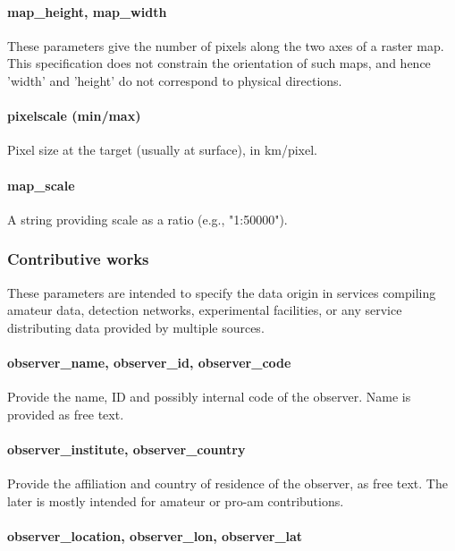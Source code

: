 \documentclass[11pt,a4paper]{ivoa}
\begin{document}
\paragraph{map\_height, map\_width}

These parameters give the number of pixels along the two axes of a raster map.
This specification does not constrain the orientation of such maps,
and hence 'width' and 'height' do not correspond to physical directions.

\paragraph{pixelscale (min/max)}

Pixel size at the target (usually at surface), in km/pixel.

\paragraph{map\_scale}
A string providing scale as a ratio (e.g., "1:50000").

\subsubsection{Contributive works}

These parameters are intended to specify the data origin in services
compiling amateur data, detection networks, experimental facilities,
or any service distributing data provided by multiple sources.

\paragraph{observer\_name, observer\_id, observer\_code}

Provide the name, ID and possibly internal code of the observer.
Name is provided as free text.

\paragraph{observer\_institute, observer\_country}

Provide the affiliation and country of residence of the observer, as free text. The later is mostly intended for amateur or pro-am contributions.

\paragraph{observer\_location, observer\_lon, observer\_lat}
\end{document}
